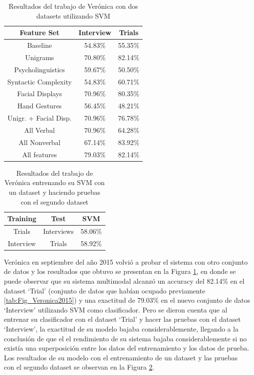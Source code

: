 \begin{onehalfspacing}
\begin{table}[h!]
\centering
    \begin{tabular}{|c|c|c|}
        \hline 
        Feature Set & Interview & Trials\tabularnewline
        \hline 
        \hline 
        Baseline & 54.83\% & 55.35\%\tabularnewline
        \hline 
        Unigrams & 70.80\% & 82.14\%\tabularnewline
        \hline 
        Psycholinguistics & 59.67\% & 50.50\%\tabularnewline
        \hline 
        Syntactic Complexity & 54.83\% & 60.71\%\tabularnewline
        \hline 
        Facial Displays & 70.96\% & 80.35\%\tabularnewline
        \hline 
        Hand Gestures & 56.45\% & 48.21\%\tabularnewline
        \hline 
        Unigr. + Facial Disp. & 70.96\% & 76.78\%\tabularnewline
        \hline 
        All Verbal & 70.96\% & 64.28\%\tabularnewline
        \hline 
        All Nonverbal & 67.14\% & 83.92\%\tabularnewline
        \hline 
        All features & 79.03\% & 82.14\%\tabularnewline
        \hline 
    \end{tabular}%
    \caption{\footnotesize Resultados del trabajo de Verónica con dos datasets utilizando SVM}
	\label{tab:Fig_Veronica2datasets}
\end{table}

\begin{table}[h!]
\centering
    \begin{tabular}{|c|c|c|}
        \hline 
        Training & Test & SVM\tabularnewline
        \hline 
        \hline 
        Trials & Interviews & 58.06\%\tabularnewline
        \hline 
        Interview & Trials & 58.92\%\tabularnewline
        \hline 
    \end{tabular}%
	\caption{\footnotesize Resultados del trabajo de Verónica entrenando su SVM con un dataset y haciendo pruebas con el segundo dataset}
	\label{tab:Fig_VeronicaCrossDomain}
\end{table}

Verónica en septiembre del año 2015 volvió a probar el sistema con otro conjunto de datos y los resultados que obtuvo se presentan en la Figura \ref{tab:Fig_Veronica2datasets}, en donde se puede observar que su sistema multimodal alcanzó un accuracy del 82.14\% en el dataset `Trial' (conjunto de datos que habían ocupado previamente \ref{tab:Fig_Veronica2015}) y una exactitud de 79.03\% en el nuevo conjunto de datos `Interview' utilizando SVM como clasificador. Pero se dieron cuenta que al entrenar su clasificador con el dataset `Trial' y hacer las pruebas con el dataset `Interview', la exactitud de su modelo bajaba considerablemente, llegando a la conclusión de que el el rendimiento de su sistema bajaba considerablemente si no existía una superposición entre los datos del entrenamiento y los datos de prueba. Los resultados de su modelo con el entrenamiento de un dataset y las pruebas con el segundo dataset se observan en la Figura \ref{tab:Fig_VeronicaCrossDomain}.\\


\end{onehalfspacing}
